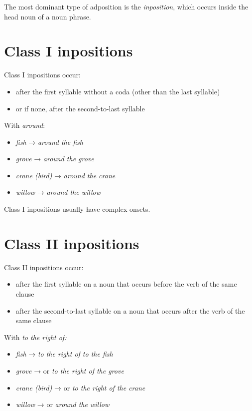 \documentclass{book}
\begin{document}
The most dominant type of adposition is the \emph{inposition}, which occurs inside the head noun of a noun phrase.

\section{Class I inpositions}

Class I inpositions occur:

\begin{itemize}
  \item after the first syllable without a coda (other than the last syllable)
  \item or if none, after the second-to-last syllable
\end{itemize}

With  \emph{around}:

\begin{itemize}
  \item {} \emph{fish} →  \emph{around the fish}
  \item {} \emph{grove} →  \emph{around the grove}
  \item {} \emph{crane (bird)} →  \emph{around the crane}
  \item {} \emph{willow} →  \emph{around the willow}
\end{itemize}

Class I inpositions usually have complex onsets.

\section{Class II inpositions}

Class II inpositions occur:

\begin{itemize}
  \item after the first syllable on a noun that occurs before the verb of the same clause
  \item after the second-to-last syllable on a noun that occurs after the verb of the same clause
\end{itemize}

With  \emph{to the right of:}

\begin{itemize}
  \item {} \emph{fish} →  \emph{to the right of to the fish}
  \item {} \emph{grove} →  or  \emph{to the right of the grove}
  \item {} \emph{crane (bird)} →  or  \emph{to the right of the crane}
  \item {} \emph{willow} →  or  \emph{around the willow}
\end{itemize}
\end{document}
